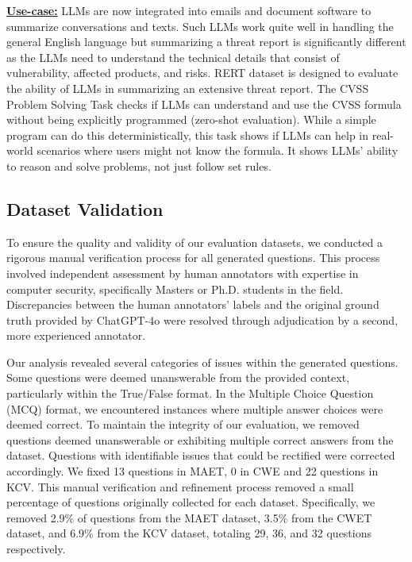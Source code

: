 \documentclass[conference]{IEEEtran}
\begin{document}
\underline{\textbf{Use-case:}} LLMs are now integrated into emails and document software to summarize conversations and texts. Such LLMs work quite well in handling the general English language but summarizing a threat report is significantly different as the LLMs need to understand the technical details that consist of vulnerability, affected products, and risks. RERT dataset is designed to evaluate the ability of LLMs in summarizing an extensive threat report. The CVSS Problem Solving Task checks if LLMs can understand and use the CVSS formula without being explicitly programmed (zero-shot evaluation). While a simple program can do this deterministically, this task shows if LLMs can help in real-world scenarios where users might not know the formula. It shows LLMs' ability to reason and solve problems, not just follow set rules.



\subsection{Dataset Validation}\label{sec:datasetvalidate}
To ensure the quality and validity of our evaluation datasets, we conducted a rigorous manual verification process for all generated questions. This process involved independent assessment by human annotators with expertise in computer security, specifically Masters or Ph.D. students in the field. Discrepancies between the human annotators' labels and the original ground truth provided by ChatGPT-4o were resolved through adjudication by a second, more experienced annotator.

Our analysis revealed several categories of issues within the generated questions. Some questions were deemed unanswerable from the provided context, particularly within the True/False format. In the Multiple Choice Question (MCQ) format, we encountered instances where multiple answer choices were deemed correct. To maintain the integrity of our evaluation, we removed questions deemed unanswerable or exhibiting multiple correct answers from the dataset. Questions with identifiable issues that could be rectified were corrected accordingly. We fixed 13 questions in MAET, 0 in CWE and 22 questions in KCV. This manual verification and refinement process removed a small percentage of questions originally collected for each dataset. Specifically, we removed 2.9\% of questions from the MAET dataset, 3.5\% from the CWET dataset, and 6.9\% from the KCV dataset, totaling 29, 36, and 32 questions respectively.
 
\end{document}
